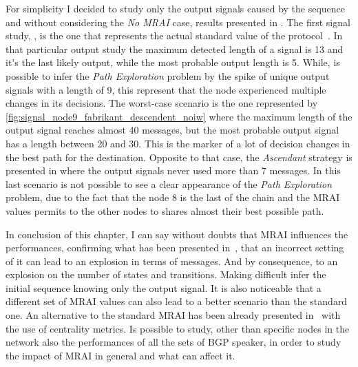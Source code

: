 For simplicity I decided to study only the output signals caused by the sequence
 and without considering the \textit{No MRAI} case, results presented in
.
The first signal study, , is the
one that represents the actual standard value of the protocol~\cite{rfc4271}.
In that particular output study the maximum detected length of
a signal is \num{13} and it's the last likely output, while the most probable
output length is \num{5}.
While, is possible to infer the \textit{Path Exploration} problem by the spike of unique
output signals with a length of \num{9}, this represent that the node experienced multiple
changes in its decisions.
The worst-case scenario is the one represented by \cref{fig:signal_node9_fabrikant_descendent_noiw}
where the maximum length of the output signal reaches almost \num{40} messages, but
the most probable output signal has a length between \num{20} and \num{30}.
This is the marker of a lot of decision changes in the best path for the destination.
Opposite to that case, the \textit{Ascendant} strategy is presented in
 where the output
signals never used more than \num{7} messages.
In this last scenario is not possible to see a clear appearance of the \textit{Path Exploration}
problem, due to the fact that the node \num{8} is the last of the chain and
the \ac{MRAI} values permits to the other nodes to shares almost their best
possible path.

In conclusion of this chapter, I can say without doubts that \ac{MRAI} influences
the performances, confirming what has been presented in~\cite{fabrikant2011there},
that an incorrect setting of it can lead to an explosion in terms of messages.
And by consequence, to an explosion on the number of states and transitions.
Making difficult infer the initial sequence knowing only the output signal.
It is also noticeable that a different set of \ac{MRAI} values can also lead
to a better scenario than the standard one.
An alternative to the standard \ac{MRAI} has been already presented in~\cite{milani2020improving}
with the use of centrality metrics.
Is possible to study, other than specific nodes in the network also the performances
of all the sets of \ac{BGP} speaker, in order to study the impact of \ac{MRAI}
in general and what can affect it.
